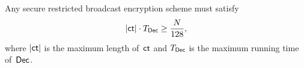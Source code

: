 \begin{theorem}\label{thm:lower-bound}
Any secure restricted broadcast encryption scheme must satisfy
\begin{align*}
|\ct|\cdot\TDec\geq\frac{N}{128},
\end{align*}
where $|\ct|$ is the maximum length of~$\ct$ and
$\TDec$ is the maximum running time of~$\Dec$.
\end{theorem}
